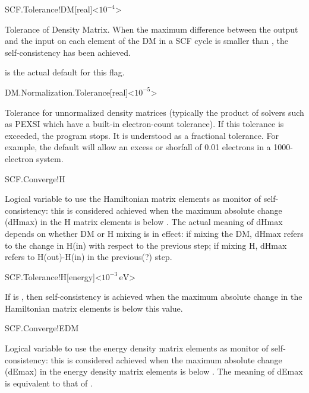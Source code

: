 \begin{fdfentry}{SCF.Tolerance!DM}[real]<$10^{-4}$>

  Tolerance of Density Matrix.
  When the maximum difference between the output and the input on each
  element of the DM in a SCF cycle is smaller than
  , the self-consistency has been achieved.


  \note {} is the actual default for this flag.

\end{fdfentry}

\begin{fdfentry}{DM.Normalization.Tolerance}[real]<$10^{-5}$>

  Tolerance for unnormalized density matrices (typically the product
  of solvers such as PEXSI which have a built-in electron-count
  tolerance). If this tolerance is exceeded, the program stops. It is
  understood as a fractional tolerance. For example, the default will
  allow an excess or shorfall of 0.01 electrons in a 1000-electron
  system.

\end{fdfentry}



\begin{fdflogicalT}{SCF.Converge!H}

  Logical variable to use the Hamiltonian matrix elements as monitor
  of self-consistency: this is considered achieved when the maximum
  absolute change (dHmax) in the H matrix elements is below
  . The actual meaning of dHmax depends on
  whether DM or H mixing is in effect: if mixing the DM, dHmax refers
  to the change in H(in) with respect to the previous step; if mixing
  H, dHmax refers to H(out)-H(in) in the previous(?) step. 
  
\end{fdflogicalT}

\begin{fdfentry}{SCF.Tolerance!H}[energy]<$10^{-3}\,\mathrm{eV}$>

  If  is \fdftrue, then self-consistency is
  achieved when the maximum absolute change in the Hamiltonian matrix
  elements is below this value.
  
\end{fdfentry}


\begin{fdflogicalT}{SCF.Converge!EDM}

  Logical variable to use the energy density matrix elements as monitor
  of self-consistency: this is considered achieved when the maximum
  absolute change (dEmax) in the energy density matrix elements is below
  . The meaning of dEmax is equivalent to that
  of .
  
\end{fdflogicalT}

